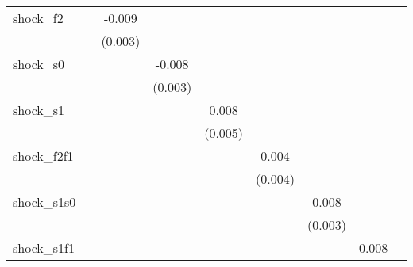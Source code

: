 {\begin{tabular}{l*{8}{c}}
\addlinespace
shock\_f2    &                     &      -0.009\sym{***}&                     &                     &                     &                     &                     &                     \\
            &                     &     (0.003)         &                     &                     &                     &                     &                     &                     \\
\addlinespace
shock\_s0    &                     &                     &      -0.008\sym{***}&                     &                     &                     &                     &                     \\
            &                     &                     &     (0.003)         &                     &                     &                     &                     &                     \\
\addlinespace
shock\_s1    &                     &                     &                     &       0.008         &                     &                     &                     &                     \\
            &                     &                     &                     &     (0.005)         &                     &                     &                     &                     \\
\addlinespace
shock\_f2f1  &                     &                     &                     &                     &       0.004         &                     &                     &                     \\
            &                     &                     &                     &                     &     (0.004)         &                     &                     &                     \\
\addlinespace
shock\_s1s0  &                     &                     &                     &                     &                     &       0.008\sym{***}&                     &                     \\
            &                     &                     &                     &                     &                     &     (0.003)         &                     &                     \\
\addlinespace
shock\_s1f1  &                     &                     &                     &                     &                     &                     &       0.008         &                     \\

\end{tabular}}
